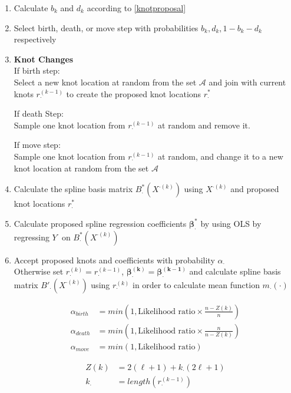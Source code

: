 \documentclass[11pt]{article}\usepackage[]{graphicx}\usepackage[]{color}
\begin{document}
\begin{enumerate}
\item
Calculate $b_k$ and $d_k$ according to \eqref{knotproposal} \\

\item
Select birth, death, or move step with probabilities $b_k,d_k,1-b_k-d_k$ respectively \\

\item
{\bf Knot Changes} \\
If birth step:\\
Select a new knot location at random from the set $\mathcal{A}$ and join with current knots $r_{\cdot}^{(k-1)}$ to create the proposed knot locations $r_{\cdot}^{*}$

If death Step:\\
Sample one knot location from $r_{\cdot}^{(k-1)}$ at random and remove it. 

If move step:\\
Sample one knot location from $r_{\cdot}^{(k-1)}$ at random, and change it to a new knot location at random from the set $\mathcal{A}$


\item
Calculate the spline basis matrix $B^*_{\cdot}(X^{\cdot(k)})$ using $X^{\cdot(k)}$ and proposed knot locations $r_{\cdot}^{*}$

\item
Calculate proposed spline regression coefficients $\boldsymbol{\beta^*_{\cdot}}$ by using OLS by regressing $Y^{\cdot}$ on $B^*_{\cdot}(X^{\cdot(k)})$

\item
Accept proposed knots and coefficients with probability $\alpha_{\cdot}$ \\

Otherwise set $r_{\cdot}^{(k)}=r_{\cdot}^{(k-1)}$, $\boldsymbol{\beta^{(k)}_{\cdot}} =\boldsymbol{\beta^{(k-1)}_{\cdot}}$ and calculate spline basis matrix $B'_{\cdot}(X^{\cdot(k)})$ using $r_{\cdot}^{(k)}$ in order to calculate mean function $m_{\cdot}(\cdot)$

\begin{align*}
\alpha_{birth} &= min\left(1, \text{Likelihood ratio}\times \frac{n-Z(k)}{n} \right) \\
\alpha_{death} &= min\left(1, \text{Likelihood ratio}\times \frac{n}{n-Z(k)} \right) \\
\alpha_{move} &= min\left(1, \text{Likelihood ratio}\right) 
\end{align*}


\begin{align*}
Z(k) &= 2(\ell+1) + k_{\cdot}(2\ell+1) \\
k_{\cdot} &= length(r_{\cdot}^{(k-1)}) 
\end{align*}


\end{enumerate}
\end{document}
